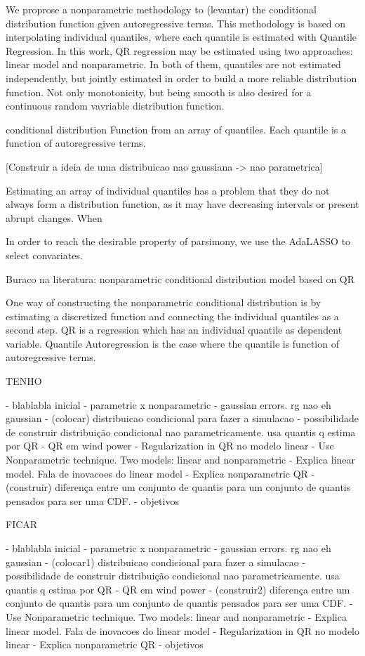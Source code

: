 
We proprose a nonparametric methodology to (levantar) the conditional distribution function given autoregressive terms. This methodology is based on interpolating individual quantiles, where each quantile is estimated with Quantile Regression. In this work, QR regression may be estimated using two approaches: linear model and nonparametric. In both of them, quantiles are not estimated independently, but jointly estimated in order to build a more reliable distribution function. Not only monotonicity, but being smooth is also desired for a continuous random vavriable distribution function.


conditional distribution Function from an array of quantiles. Each quantile is a function of autoregressive terms.



[Construir a ideia de uma distribuicao nao gaussiana -> nao parametrica]

Estimating an array of individual quantiles has a problem that they do not always form a distribution function, as it may have decreasing intervals or present abrupt changes. When 
 

In order to reach the desirable property of parsimony, we use the AdaLASSO to select convariates.

 
Buraco na literatura: nonparametric conditional distribution model based on QR 

One way of constructing the nonparametric conditional distribution is by estimating a discretized function and connecting the individual quantiles as a second step. QR is a regression which has an individual quantile as dependent variable. Quantile Autoregression is the case where the quantile is function of autoregressive terms. 


TENHO

- blablabla inicial
- parametric x nonparametric
- gaussian errors. rg nao eh gaussian
- (colocar) distribuicao condicional para fazer a simulacao
- possibilidade de construir distribuição condicional nao parametricamente. usa quantis q estima por QR
- QR em wind power
- Regularization in QR no modelo linear
- Use Nonparametric technique. Two models: linear and nonparametric
- Explica linear model. Fala de inovacoes do linear model
- Explica nonparametric QR
- (construir) diferença entre um conjunto de quantis para um conjunto de quantis pensados para ser uma CDF.
- objetivos

FICAR

- blablabla inicial
- parametric x nonparametric
- gaussian errors. rg nao eh gaussian
- (colocar1) distribuicao condicional para fazer a simulacao
- possibilidade de construir distribuição condicional nao parametricamente. usa quantis q estima por QR
- QR em wind power
- (construir2) diferença entre um conjunto de quantis para um conjunto de quantis pensados para ser uma CDF.
- Use Nonparametric technique. Two models: linear and nonparametric
- Explica linear model. Fala de inovacoes do linear model
- Regularization in QR no modelo linear
- Explica nonparametric QR
- objetivos

